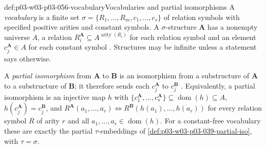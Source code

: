 \begin{hbconvention}{def:p03-w03-p03-056-vocabulary}{Vocabularies and partial isomorphisms}
A \emph{vocabulary} is a finite set
\(\sigma=\{R_1,\ldots,R_m,c_1,\ldots,c_s\}\) of relation symbols with
specified positive arities and constant symbols. A \(\sigma\)-structure
\(\mathbf A\) has a nonempty universe \(A\), a relation
\(R_i^{\mathbf A}\subseteq A^{\operatorname{arity}(R_i)}\) for each relation
symbol and an element \(c_j^{\mathbf A}\in A\) for each constant symbol
\cite[p.~3]{Kolaitis2003ExpressivePowerNotes}. Structures may be
infinite unless a statement says otherwise.

A \emph{partial isomorphism} from \(\mathbf A\) to \(\mathbf B\) is an
isomorphism from a substructure of \(\mathbf A\) to a substructure of
\(\mathbf B\); it therefore sends each \(c_j^{\mathbf A}\) to \(c_j^{\mathbf B}\)
\cite[pp.~3--4]{Kolaitis2003ExpressivePowerNotes}. Equivalently, a
partial isomorphism is an injective map \(h\) with
\(\{c_1^{\mathbf A},\ldots,c_s^{\mathbf A}\}\subseteq\operatorname{dom}(h)
\subseteq A\), \(h(c_j^{\mathbf A})=c_j^{\mathbf B}\), and
\(R^{\mathbf A}(a_1,\ldots,a_r)\iff R^{\mathbf B}(h(a_1),\ldots,h(a_r))\)
for every relation symbol \(R\) of arity \(r\) and all
\(a_1,\ldots,a_r\in\operatorname{dom}(h)\). For a constant-free vocabulary
these are exactly the partial \(\tau\)-embeddings of
\cref{def:p03-w03-p03-039-partial-iso}, with \(\tau=\sigma\).
\end{hbconvention}


